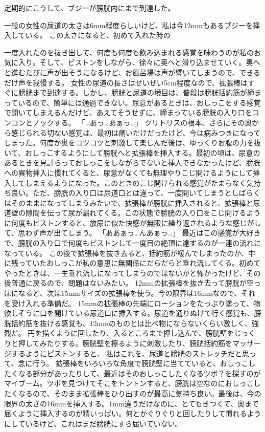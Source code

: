 定期的にこうして、ブジーが膀胱内にまで到達した。

一般の女性の尿道の太さは6mm程度らしいけど、私は今12mmもあるブジーを挿入している。
この太さになると、初めて入れた時の




一度入れたのを抜き出して、何度も何度も飲み込まれる感覚を味わうのが私のお気に入り。そして、ピストンをしながら、徐々に奥へと滑り込ませていく。奥へと進むたびに声が出そうになるけど、お風呂場は声が響いてしまうので、できるだけ声を我慢する。
女性の尿道の長さはせいぜい5cm程度なので、拡張棒はすぐに膀胱まで到達する。しかし、膀胱と尿道の境目は、普段は膀胱括約筋が締まっているので、簡単には通過できない。尿意があるときは、おしっこをする感覚で開いてしまえるんだけど、あえてそうせずに、締まっている膀胱の入り口をコンコンとノックする。
「…あっ…あぁっ…」
クリトリスの根本、さらにその奥から感じられる切ない感覚は、最初は痛いだけだったけど、今は病みつきになってしまった。何度か奥をコツコツと刺激して楽しんだ後は、ゆっくりお腹の力を抜いて、おしっこするようにして膀胱へと拡張棒を挿入する。最初の頃は、尿意のあるときを見計らっておしっこをしながらでないと挿入できなかったけど、膀胱への異物挿入に慣れてくると、尿意がなくても無理やりこじ開けるようにして挿入してしまえるようになった。このときのこじ開けられる感覚がたまらなく気持ち良い。ただ、膀胱の入り口は尿道口とは違って、一度開いてしまうとしばらくはそのままになってしまうみたいで、拡張棒が膀胱に挿入されると、拡張棒と尿道壁の隙間を伝って尿が漏れてくる。この状態で膀胱の入り口をこじ開けるように何度もピストンすると、放尿に似た快感が無限に繰り返されるような感じがして、思わず声が出てしまう。
「ああぁっ…んあぁっ…」
最近はこの感覚が大好きで、膀胱の入り口で何度もピストンして一度目の絶頂に達するのが一連の流れになっている。
この後で拡張棒を抜き去ると、括約筋が緩んでしまったのか、中に残っていたおしっこが私の意思に無関係にだらだらと垂れ流してくる。初めてやったときは、一生垂れ流しになってしまうのではないかと怖かったけど、その後普通に戻るので、問題はないみたい。
12mmの拡張棒を抜き去って膀胱が空っぽになると、次は15mmサイズの拡張棒を使う。今の限界は16mmなので、それを受け入れる準備だ。
15mmの拡張棒の先端にローションをたっぷり塗って、物欲しそうに口を開けている尿道口に挿入する。尿道を通りぬけて行く感覚も、膀胱括約筋を抜ける感覚も、12mmのものとは比べ物にならないくらい激しく、強烈だ。
円を描くように回したり、入るところまで押し込んで、膀胱壁をじっくりと押してみたりする。膀胱壁を擦るように刺激したり、膀胱括約筋をマッサージするようにピストンすると、
私はこれを、尿道と膀胱のストレッチだと思って、念に行う。
拡張棒をいろいろな角度で膀胱壁に当てていると、おしっこしたくなる部分があったりして、最近はそのおしっこしたくなるツボ？を探すのがマイブーム。ツボを見つけてそこをトントンすると、膀胱は空なのにおしっこしたくなるので、そのまま拡張棒をひり出すのが最高に気持ち良い。最後は、今の限界の太さの16mmを挿入する。1mm違うだけなのに、とてもきつくて、奥まで届くように挿入するのが精いっぱい。何とかぐりぐりと回したりして慣れるようにしているけど、これはまだ膀胱にすら届いていない。

